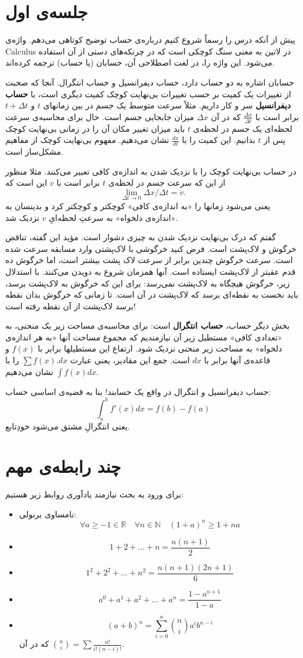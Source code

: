 \documentclass[12pt,a4paper]{article}
\theoremstyle{definition}
\begin{document}
\section{جلسه‌ی اول}
پیش از آنکه درس را رسماً شروع کنیم درباره‌ی حساب توضیح کوتاهی می‌دهم.
واژه‌ی 
Calculus
در لاتین به معنی سنگ کوچکی است که در چرتکه‌های دستی از آن استفاده می‌شود. 
این واژه را، در لغت اصطلاحی آن، حسابان (یا حساب) ترجمه کرده‌اند.
\par 
حسابان اشاره به دو حساب دارد، حساب دیفرانسیل و حساب انتگرال.
آنجا که صحبت از تغییرات یک کمیت بر حسب تغییرات بی‌نهایت کوچک کمیت دیگری است، با 
\textbf{حساب 
دیفرانسیل 
}
سر و کار داریم. مثلاً 
سرعت متوسط یک جسم در بین زمانهای 
$t$
و
$t+\Delta t$
برابر است با 
$\frac{\Delta x}{\Delta t}$
که در آن
$\Delta x$
میزان جابجایی جسم است. حال
برای محاسبه‌ی سرعت لحظه‌ای یک جسم در لحظه‌ی 
$t$
 باید میزان
تغییر مکان آن را 
در زمانی بی‌نهایت کوچک پس از
$t$
بدانیم. 
این کمیت را با
$\frac{dx}{dt}$
نشان می‌دهیم. 
مفهوم بی‌نهایت کوچک از 
مفاهیم مشکل‌ساز است.
\par 
در حساب بی‌نهایت کوچک را با نزدیک شدن به اندازه‌ی کافی تعبیر می‌کنند. مثلا منظور از این که
سرعت جسم در لحظه‌ی
$t$
برابر است با 
$v$
این است که 
\[
\lim_{\Delta t\to 0} \Delta x/\Delta t =v.
\]
یعنی می‌شود زمانها را «به اندازه‌ی کافی» کوچکتر و کوچکتر کرد و بدینسان به  «اندازه‌ی دلخواه» به سرعتِ
لحظه‌ایِ
$v$
نزدیک شد. 
\par 
گفتم که درک بی‌نهایت نزدیک شدن به چیزی دشوار است. مؤید این گفته، تناقض خرگوش و لاک‌پشت است. 
فرض کنید خرگوشی با لاک‌پشتی وارد مسابقه سرعت شده است. سرعت خرگوش چندین برابر از سرعت لاک پشت بیشتر است، اما خرگوش ده قدم عقبتر از لاک‌پشت ایستاده است. 
آنها همزمان شروع به دویدن می‌کنند. با استدلال زیر، خرگوش هیچگاه به لاک‌پشت نمی‌رسد:
برای این که خرگوش به لاک‌پشت برسد، باید نخست به نقطه‌ای برسد که لاک‌پشت
در آن است. تا زمانی که خرگوش بدان نقطه برسد لاک‌پشت از آن نقطه رفته است!
\par 
بخش دیگر حساب،\textbf{ حساب انتگرال }است: برای محاسبه‌ی مساحت زیر یک منحنی، به 
«تعدادی کافی»
مستطیل زیر آن نیازمندیم که 
مجموع مساحت آنها «به هر اندازه‌ی دلخواه» به مساحت زیر منحنی نزدیک شود.
ارتفاع این مستطیلها برابر با
$f(x)$
و قاعده‌ی آنها برابر با
$dx$
است. جمع این مقادیر، یعنی عبارت
$\sum f(x).dx$
را با
$\int f(x)dx$
نشان می‌دهیم. 
\par 
حساب دیفرانسیل و انتگرال در واقع یک حسابند! بنا به قضیه‌ی اساسی حساب:
\[
\int_a^b f'(x)dx=f(b)-f(a)
\]
یعنی انتگرالِ مشتق می‌شود خودِ‌تابع.
\section*{چند رابطه‌ی مهم}
برای ورود به بحث نیازمند یادآوری روابط زیر هستیم:
\begin{itemize}
\item
نامساوی برنولی:
\[
\forall a\geqslant -1 \in \mathbb{R}\quad \forall n\in \mathbb{N}\quad  (1+a)^n \geqslant 1+na
\]
\item
\[
1+2+...+n=\frac{n(n+1)}{2}
\]
\item
\[1^2+2^2+...+n^2=\frac{n(n+1)(2n+1)}{6}\]
\item
\[a^0+a^1+a^2+...+a^n=\frac{1-a^{n+1}}{1-a}\]
\item
\[(a+b)^n=\sum_{i=0}^n \binom{n}{i} a^i b^{n-i} \]
که در آن
$ \binom{n}{i}= \sum \frac{n! }{i! (n-i)!}$.
\end{itemize}
\end{document}
